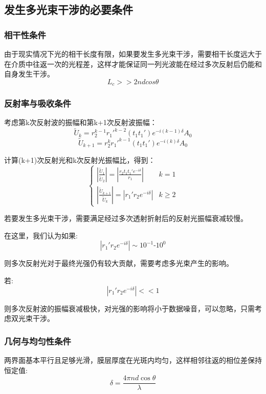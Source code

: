 \documentclass[a4paper]{ctexart}
\begin{document}
\subsection{发生多光束干涉的必要条件}
\subsubsection{相干性条件}
由于现实情况下光的相干长度有限，如果要发生多光束干涉，需要相干长度远大于在介质中往返一次的光程差，这样才能保证同一列光波能在经过多次反射后仍能和自身发生干涉。
\begin{equation}
    L_c >> 2ndcos\theta
\end{equation}

\subsubsection{反射率与吸收条件}
考虑第k次反射波的振幅和第k+1次反射波振幅：
\begin{equation}
    \tilde{U}_k = r_2^{k-1}r_1'^{k-2} (t_1 t_1') e^{-i(k-1)\delta} A_0
\end{equation}
\begin{equation}
    \tilde{U}_{k+1} = r_2^{k}r_1'^{k-1} (t_1 t_1') e^{-i(k)\delta} A_0
\end{equation}

计算(k+1)次反射光和k次反射光振幅比，得到：
\[
\begin{cases}
\left|\frac{\tilde{U}_{1}}{\tilde{U}_2}\right| = \left|\frac{r_2t_1t_1'e^{-i\delta}}{r_1}\right| & k = 1 \\[6pt]
\left|\frac{\tilde{U}_{k+1}}{\tilde{U}_k}\right| = \left|r_1'r_2e^{-i\delta} \right|  & k \geq 2
\end{cases}
\]

若要发生多光束干涉，需要满足经过多次透射折射后的反射光振幅衰减较慢。

在这里，我们认为如果:
\begin{equation}
    \left|r_1'r_2e^{-i\delta} \right| \sim 10^{-1} \text{-} 10^{0}
\end{equation}

则多次反射光对于最终光强仍有较大贡献，需要考虑多光束产生的影响。

若:
\begin{equation}
    \left|r_1'r_2e^{-i\delta} \right| <<1
\end{equation}

则多次反射波的振幅衰减极快，对光强的影响将小于数据噪音，可以忽略，只需考虑双光束干涉。

\subsubsection{几何与均匀性条件}
两界面基本平行且足够光滑，膜层厚度在光斑内均匀，这样相邻往返的相位差保持恒定值:
\begin{equation}
    \delta = \frac{4 \pi n d \cos \theta}{\lambda}
\end{equation}
\end{document}
